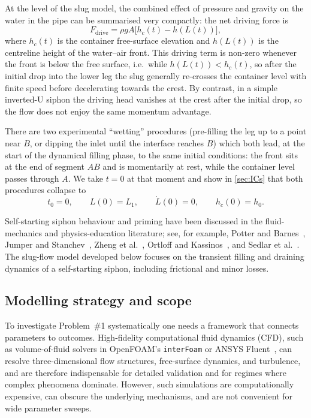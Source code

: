 \documentclass[11pt]{article}
\begin{document}
At the level of the slug model, the combined effect of pressure and gravity on the water in
the pipe can be summarised very compactly: the net driving force is
\begin{equation}
  F_{\text{drive}} = \rho g A\bigl[h_c(t) - h(L(t))\bigr],
  \label{eq:Fdrive}
\end{equation}
where $h_c(t)$ is the container free-surface elevation and $h(L(t))$ is the centreline height
of the water--air front. This driving term is non-zero whenever the front is below the free
surface, i.e.\ while $h(L(t))<h_c(t)$, so after the initial drop into the lower leg the slug
generally re-crosses the container level with finite speed before decelerating towards the
crest. By contrast, in a simple inverted-U siphon the driving head vanishes at the crest
after the initial drop, so the flow does not enjoy the same momentum advantage.

There are two experimental ``wetting'' procedures (pre-filling the leg up to a point
near $B$, or dipping the inlet until the interface reaches $B$) which both lead, at the start
of the dynamical filling phase, to the same initial conditions: the front sits at the end of
segment $AB$ and is momentarily at rest, while the container level passes through $A$.
We take $t=0$ at that moment and show in \cref{sec:ICs} that both procedures collapse to
\[
  t_0 = 0,\qquad L(0) = L_1,\qquad \dot L(0) = 0,\qquad h_c(0) = h_0.
\]

Self-starting siphon behaviour and priming have been discussed in the fluid-mechanics and
physics-education literature; see, for example, Potter and Barnes~\cite{potter_barnes}, Jumper and Stanchev~\cite{jumper_stanchev},
Zheng et al.~\cite{zheng_siphon}, Ortloff and Kassinos~\cite{ortloff_kassinos}, and Sedlar et al.~\cite{sedlar_siphon}.
The slug-flow model developed below focuses on the transient filling and draining dynamics
of a self-starting siphon, including frictional and minor losses.

\subsection{Modelling strategy and scope}

To investigate Problem~\#1 systematically one needs a framework that connects parameters to outcomes.
High-fidelity computational fluid dynamics (CFD), such as volume-of-fluid solvers in OpenFOAM's \texttt{interFoam} or ANSYS Fluent~\cite{openfoam,ansys_fluent}, can resolve three-dimensional flow structures, free-surface dynamics, and turbulence, and are therefore indispensable for detailed validation and for regimes where complex phenomena dominate. However, such simulations are computationally expensive, can obscure the underlying mechanisms, and are not convenient for wide parameter sweeps.
\end{document}
